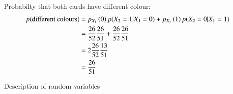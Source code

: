 \documentclass[journal,12pt,onecolumn]{IEEEtran}
\begin{document}
Probabilty that both cards have different colour:\\
\begin{align}
p(\text{different colours}) &= p_{X_1}\left(0\right)p(X_2=1|X_1=0) + p_{X_1}\left(1\right)p(X_2=0|X_1=1)\\
                           &= \frac{26}{52}\frac{26}{51}+\frac{26}{52}\frac{26}{51}\\
                           &= 2\frac{26}{52}\frac{13}{51}\\
                           &=\frac{26}{51}
\end{align}
\begin{table}[H]
        \caption{Description of random variables}
        \label{tab:ncert/11/16/3/20/}
        \centering
        
\end{table}
\end{document}
